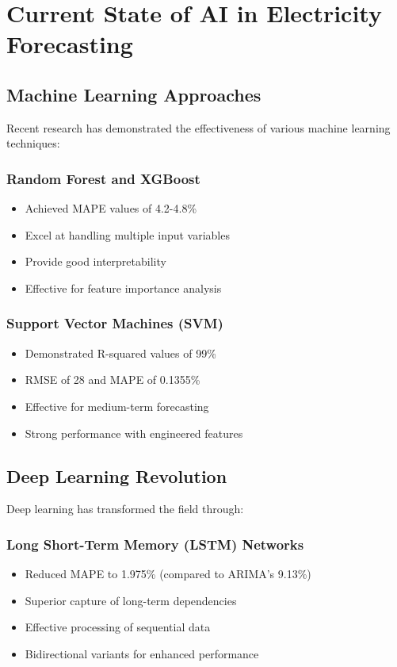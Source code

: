\documentclass[12pt,a4paper]{report}
\begin{document}
\section{Current State of AI in Electricity Forecasting}

\subsection{Machine Learning Approaches}
Recent research has demonstrated the effectiveness of various machine learning techniques:

\subsubsection{Random Forest and XGBoost}
\begin{itemize}
\item Achieved MAPE values of 4.2-4.8\%
\item Excel at handling multiple input variables
\item Provide good interpretability
\item Effective for feature importance analysis
\end{itemize}

\subsubsection{Support Vector Machines (SVM)}
\begin{itemize}
\item Demonstrated R-squared values of 99\%
\item RMSE of 28 and MAPE of 0.1355\%
\item Effective for medium-term forecasting
\item Strong performance with engineered features
\end{itemize}

\subsection{Deep Learning Revolution}
Deep learning has transformed the field through:

\subsubsection{Long Short-Term Memory (LSTM) Networks}
\begin{itemize}
\item Reduced MAPE to 1.975\% (compared to ARIMA's 9.13\%)
\item Superior capture of long-term dependencies
\item Effective processing of sequential data
\item Bidirectional variants for enhanced performance
\end{itemize}
\end{document}

